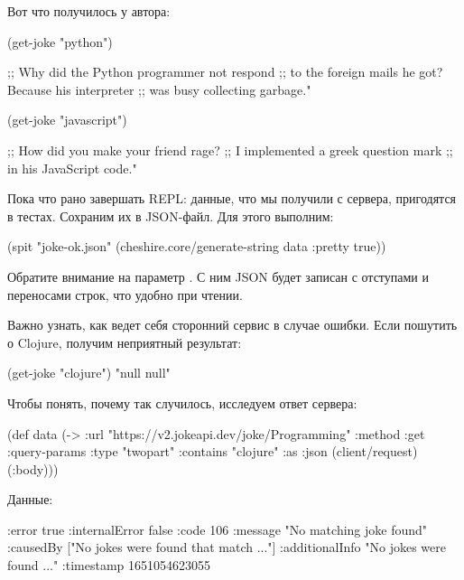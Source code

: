 \pagebreaklarge

Вот что получилось у автора:

\begin{english}
  \begin{clojure}
(get-joke "python")

;; Why did the Python programmer not respond
;; to the foreign mails he got? Because his interpreter
;; was busy collecting garbage."

(get-joke "javascript")

;; How did you make your friend rage?
;; I implemented a greek question mark
;; in his JavaScript code."
  \end{clojure}
\end{english}

Пока что рано завершать REPL: данные, что мы получили с сервера, пригодятся в тестах. Сохраним их в JSON-файл. Для этого выполним:

\begin{english}
  \begin{clojure/lines}
(spit "joke-ok.json"
      (cheshire.core/generate-string
       data {:pretty true}))
  \end{clojure/lines}
\end{english}

Обратите внимание на параметр  . С ним JSON будет записан с отступами и переносами строк, что удобно при чтении.

Важно узнать, как ведет себя сторонний сервис в случае ошибки. Если пошутить о Clojure, получим неприятный результат:

\begin{english}
  \begin{clojure}
(get-joke "clojure")
"null null"
  \end{clojure}
\end{english}

Чтобы понять, почему так случилось, исследуем ответ сервера:

\begin{english}
  \begin{clojure}
(def data
  (-> {:url "https://v2.jokeapi.dev/joke/Programming"
       :method :get
       :query-params {:type "twopart" :contains "clojure"}
       :as :json}
      (client/request)
      (:body)))
  \end{clojure}
\end{english}

Данные:

\begin{english}
  \begin{clojure}
{:error true
 :internalError false
 :code 106
 :message "No matching joke found"
 :causedBy ["No jokes were found that match ..."]
 :additionalInfo "No jokes were found ..."
 :timestamp 1651054623055}
  \end{clojure}
\end{english}

